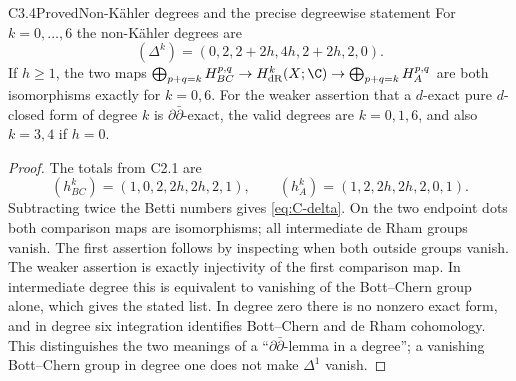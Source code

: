 \begin{claim}{C3.4}{Proved}{Non-K\"ahler degrees and the precise degreewise statement}
For $k=0,\ldots,6$ the non-K\"ahler degrees are
\begin{equation}\label{eq:C-delta}
(\Delta^k)=(0,2,2+2h,4h,2+2h,2,0).
\end{equation}
If $h\ge1$, the two maps
$\bigoplus_{p+q=k}H^{p,q}_{BC}\to H^k_{\mathrm{dR}}(X;\C)
\to\bigoplus_{p+q=k}H^{p,q}_A$
are both isomorphisms exactly for $k=0,6$.
For the weaker assertion that a $d$-exact pure $d$-closed form of
degree $k$ is $\partial\bar\partial$-exact, the valid degrees are
$k=0,1,6$, and also $k=3,4$ if $h=0$.
\end{claim}
\begin{proof}
The totals from C2.1 are
\[
(h^k_{BC})=(1,0,2,2h,2h,2,1),\qquad
(h^k_A)=(1,2,2h,2h,2,0,1).
\]
Subtracting twice the Betti numbers gives \eqref{eq:C-delta}.
On the two endpoint dots both comparison maps are isomorphisms;
all intermediate de Rham groups vanish.  The first assertion follows
by inspecting when both outside groups vanish.  The weaker assertion
is exactly injectivity of the first comparison map.  In intermediate
degree this is equivalent to vanishing of the Bott--Chern group alone,
which gives the stated list.  In degree zero there is no nonzero
exact form, and in degree six integration identifies Bott--Chern and
de Rham cohomology.  This distinguishes the two meanings of a
``$\partial\bar\partial$-lemma in a degree''; a vanishing Bott--Chern
group in degree one does not make $\Delta^1$ vanish.
\end{proof}
